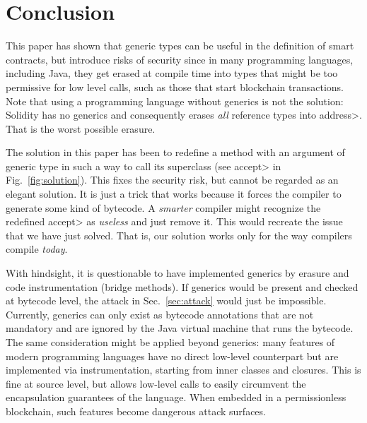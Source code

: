 \section{Conclusion}\label{sec:conclusion} 

This paper has shown that generic types can be useful in the definition
of smart contracts, but introduce risks of security since in many
programming languages, including Java, they get erased at compile time
into types that might be too permissive for low level calls, such as
those that start blockchain transactions. Note that using a programming
language without generics is not the solution: Solidity has no generics
and consequently erases \emph{all} reference types into \<address>.
That is the worst possible erasure.

The solution in this paper has been to redefine a method with an argument
of generic type in such a way to call its superclass
(see \<accept> in Fig.~\ref{fig:solution}). This fixes the security risk,
but cannot be regarded as an elegant solution. It is just a trick that
works because it forces the compiler to generate some kind of bytecode.
A \emph{smarter} compiler might recognize the redefined \<accept> as
\emph{useless} and just remove it. This would recreate the issue that
we have just solved. That is, our solution works only for the way
compilers compile \emph{today}.

With hindsight, it is questionable to have implemented generics by erasure
and code instrumentation (bridge methods). If generics would be present
and checked at bytecode level, the attack in Sec.~\ref{sec:attack} would just
be impossible. Currently, generics can only exist as bytecode annotations
that are not mandatory and are ignored by the Java virtual machine
that runs the bytecode. The same consideration might be applied beyond
generics: many features of modern programming
languages have no direct low-level
counterpart but are implemented via instrumentation, starting from
inner classes and closures. This is fine at source level, but allows
low-level calls to easily circumvent
the encapsulation guarantees of the language. When embedded in a permissionless
blockchain, such features become dangerous attack surfaces.
